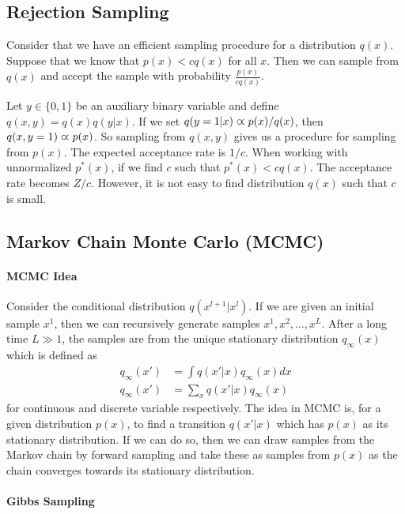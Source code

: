 \subsection{Rejection Sampling}

Consider that we have an efficient sampling procedure for a distribution $q(x)$. Suppose that we know that $p(x)<cq(x)$ for all $x$. Then we can sample from $q(x)$ and accept the sample with probability $\frac{p(x)}{cq(x)}$.

Let $y\in\{0,1\}$ be an auxiliary binary variable and define $q(x,y)=q(x)q(y|x)$. If we set $q(y=1|x)\varpropto p(x)/q(x)$, then $q(x,y=1)\varpropto p(x)$. So sampling from $q(x,y)$ gives us a procedure for sampling from $p(x)$. The expected acceptance rate is $1/c$. When working with unnormalized $p^*(x)$, if we find $c$ such that $p^*(x)<cq(x)$. The acceptance rate becomes $Z/c$. However, it is not easy to find distribution $q(x)$ such that $c$ is small.

\subsection{Markov Chain Monte Carlo (MCMC)}

\paragraph{MCMC Idea}

Consider the conditional distribution $q(x^{l+1}|x^l)$. If we are given an initial sample $x^1$, then we can recursively generate samples $x^1,x^2,\dotsc,x^L$. After a long time $L\gg 1$, the samples are from the unique stationary distribution $q_\infty(x)$ which is defined as
\begin{align*}
q_\infty(x')&=\int q(x'|x)q_\infty(x)dx \\
q_\infty(x')&=\sum_xq(x'|x)q_\infty(x)
\end{align*}
for continuous and discrete variable respectively. The idea in MCMC is, for a given distribution $p(x)$, to find a transition $q(x'|x)$ which has $p(x)$ as its stationary distribution. If we can do so, then we can draw samples from the Markov chain by forward sampling and take these as samples from $p(x)$ as the chain converges towards its stationary distribution.

\paragraph{Gibbs Sampling}

